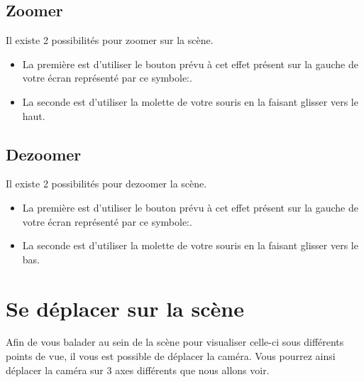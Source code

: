 \documentclass[11pt]{report}
\begin{document}

\subsection{Zoomer}

\hypertarget{zoom}{Il existe 2 possibilités pour zoomer sur la scène.}
\begin{itemize}
        \item La première est d'utiliser le bouton prévu à cet effet présent sur la gauche de votre écran représenté par ce symbole:.
        \item La seconde est d'utiliser la molette de votre souris en la faisant glisser vers le haut.
\end{itemize}

\subsection{Dezoomer}

\hypertarget{dezoom}{Il existe 2 possibilités pour dezoomer la scène.}

\begin{itemize}
        \item La première est d'utiliser le bouton prévu à cet effet présent sur la gauche de votre écran représenté par ce symbole:.
        \item La seconde est d'utiliser la molette de votre souris en la faisant glisser vers le bas.
\end{itemize}



\section{Se déplacer sur la scène}

Afin de vous balader au sein de la scène pour visualiser celle-ci sous différents points de vue, il vous est possible de déplacer la caméra. Vous pourrez ainsi déplacer la caméra sur 3 axes différents que nous allons voir.

\end{document}
